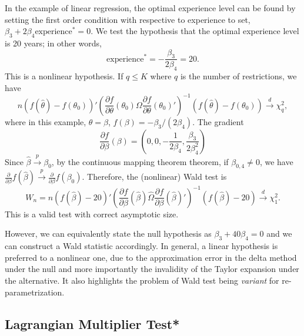 \documentclass[11pt]{article}
\begin{document}
    In the example of linear regression, the optimal experience level can be
found by setting the first order condition with respective to experience
to set, \(\beta_{3}+2\beta_{4}\mbox{experience}^{*}=0\). We test the
hypothesis that the optimal experience level is 20 years; in other
words, \[\mbox{experience}^{*}=-\frac{\beta_{3}}{2\beta_{4}}=20.\] This
is a nonlinear hypothesis. If \(q\leq K\) where \(q\) is the number of
restrictions, we have
\[n\left(f\left(\widehat{\theta}\right)-f\left(\theta_{0}\right)\right)'\left(\frac{\partial f}{\partial\theta}\left(\theta_{0}\right)\Omega\frac{\partial f}{\partial\theta}\left(\theta_{0}\right)'\right)^{-1}\left(f\left(\widehat{\theta}\right)-f\left(\theta_{0}\right)\right)\stackrel{d}{\to}\chi_{q}^{2},\]
where in this example, \(\theta=\beta\),
\(f\left(\beta\right)=-\beta_{3}/\left(2\beta_{4}\right)\). The gradient
\[\frac{\partial f}{\partial\beta}\left(\beta\right)=\left(0,0,-\frac{1}{2\beta_{4}},\frac{\beta_{3}}{2\beta_{4}^{2}}\right)\]
Since \(\widehat{\beta}\stackrel{p}{\to}\beta_{0}\), by the continuous
mapping theorem theorem, if \(\beta_{0,4}\neq0\), we have
\(\frac{\partial}{\partial\beta}f\left(\widehat{\beta}\right)\stackrel{p}{\to}\frac{\partial}{\partial\beta}f\left(\beta_{0}\right)\).
Therefore, the (nonlinear) Wald test is
\[W_{n}=n\left(f\left(\widehat{\beta}\right)-20\right)'\left(\frac{\partial f}{\partial\beta}\left(\widehat{\beta}\right)\widehat{\Omega}\frac{\partial f}{\partial\beta}\left(\widehat{\beta}\right)'\right)^{-1}\left(f\left(\widehat{\beta}\right)-20\right)\stackrel{d}{\to}\chi_{1}^{2}.\]
This is a valid test with correct asymptotic size.

However, we can equivalently state the null hypothesis as
\(\beta_{3}+40\beta_{4}=0\) and we can construct a Wald statistic
accordingly. In general, a linear hypothesis is preferred to a nonlinear
one, due to the approximation error in the delta method under the null
and more importantly the invalidity of the Taylor expansion under the
alternative. It also highlights the problem of Wald test being
\emph{variant} for re-parametrization.

    \subsection{Lagrangian Multiplier
Test*}\label{lagrangian-multiplier-test}
\end{document}
